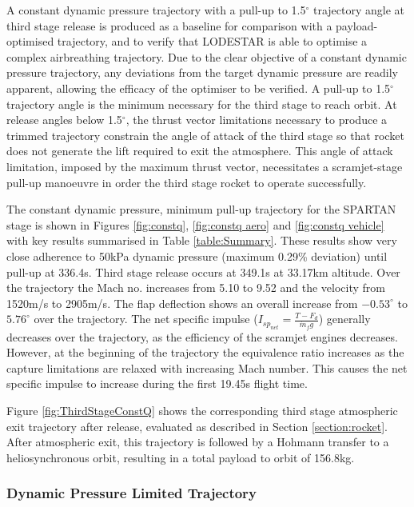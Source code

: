 \documentclass[]{aiaa-tc}
\newcommand{\PayloadToOrbitConstq}{156.8}
\newcommand{\SeparationAltConstq}{33.17}
\newcommand{\SeparationvConstq}{2905}
\newcommand{\FlightTimeConstq}{349.1}
\begin{document}
A constant dynamic pressure trajectory with a pull-up to 1.5$^\circ$ trajectory angle at third stage release is produced as a baseline for comparison with a payload-optimised trajectory, and to verify that LODESTAR is able to optimise a complex airbreathing trajectory. Due to the clear objective of a constant dynamic pressure trajectory, any deviations from the target dynamic pressure are readily apparent, allowing the efficacy of the optimiser to be verified. 
A pull-up to 1.5$^\circ$ trajectory angle is the minimum necessary for the third stage to reach orbit. At release angles below 1.5$^\circ$, the thrust vector limitations necessary to produce a trimmed trajectory constrain the angle of attack of the third stage so that rocket does not generate the lift required to exit the atmosphere. This angle of attack limitation, imposed by the maximum thrust vector, necessitates a scramjet-stage pull-up manoeuvre in order the third stage rocket to operate successfully.

 The constant dynamic pressure, minimum pull-up trajectory for the SPARTAN stage is shown in Figures \ref{fig:constq}, \ref{fig:constq aero} and \ref{fig:constq vehicle} with key results summarised in Table \ref{table:Summary}. 
 These results show very close adherence to 50kPa dynamic pressure (maximum 0.29\% deviation) until pull-up at 336.4s. Third stage release occurs at \FlightTimeConstq s at \SeparationAltConstq km altitude. 
 Over the trajectory the Mach no. increases from 5.10 to 9.52 and the velocity from 1520m/s to \SeparationvConstq m/s. The flap deflection shows an overall increase from $-0.53^\circ$ to $5.76^\circ$ over the trajectory.  The net specific impulse ($I_{sp_{net}} = \frac{T-F_d}{\dot{m}_f g}$) generally decreases over the trajectory, as the efficiency of the scramjet engines decreases. However, at the beginning of the trajectory the equivalence ratio increases as the capture limitations are relaxed with increasing Mach number. This causes the net specific impulse to increase during the first 19.45s flight time. 

Figure \ref{fig:ThirdStageConstQ} shows the corresponding third stage atmospheric exit trajectory after release, evaluated as described in Section \ref{section:rocket}. After atmospheric exit, this trajectory is followed by a Hohmann transfer to a heliosynchronous orbit, resulting in a total payload to orbit of \PayloadToOrbitConstq kg.



\subsubsection{Dynamic Pressure Limited Trajectory} \label{subsection:50kPalimit}
\end{document}

